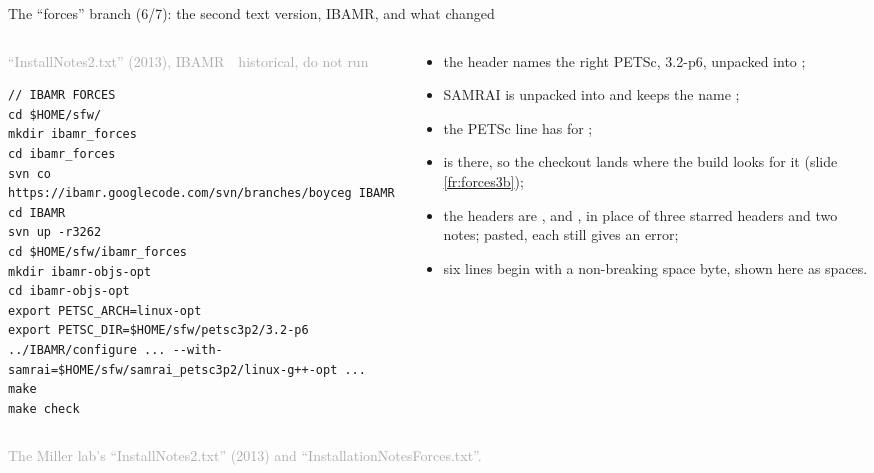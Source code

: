 \documentclass[aspectratio=169,11pt]{beamer}
\newcommand{\sourcecredit}[1]{\vfill\begin{flushright}\tiny\textcolor{DarkGray}{#1}\end{flushright}}
\newcommand{\hist}[1]{{\tiny\sffamily\textcolor{DarkGray}{#1\ \textbullet\ historical, do not run}}\par\nointerlineskip\vspace{0.3mm}}
\begin{document}
\begin{frame}[fragile]{The ``forces'' branch (6/7): the second text version, IBAMR, and what changed}
\label{fr:forces4c}
\begin{columns}[T,onlytextwidth]
\begin{column}{0.53\textwidth}
\hist{``InstallNotes2.txt'' (2013), IBAMR}
\begin{lstlisting}[style=hist]
// IBAMR FORCES
cd $HOME/sfw/
mkdir ibamr_forces
cd ibamr_forces
svn co https://ibamr.googlecode.com/svn/branches/boyceg IBAMR
cd IBAMR
svn up -r3262
cd $HOME/sfw/ibamr_forces
mkdir ibamr-objs-opt
cd ibamr-objs-opt
export PETSC_ARCH=linux-opt
export PETSC_DIR=$HOME/sfw/petsc3p2/3.2-p6
../IBAMR/configure ... --with-samrai=$HOME/sfw/samrai_petsc3p2/linux-g++-opt ...
make
make check
\end{lstlisting}
\end{column}
\begin{column}{0.44\textwidth}
\scriptsize {}
\begin{itemize}\setlength{\itemsep}{1pt}
  \item the header names the right PETSc, 3.2-p6, unpacked into ;
  \item SAMRAI is unpacked into  and keeps the name ;
  \item the PETSc line has  for ;
  \item {} is there, so the checkout lands where the build looks for it (slide \ref{fr:forces3b});
  \item the headers are ,  and , in place of three starred headers and two \code{//} notes; pasted, each still gives an error;
  \item six lines begin with a non-breaking space byte, shown here as spaces.
\end{itemize}
\end{column}
\end{columns}
\sourcecredit{The Miller lab's ``InstallNotes2.txt'' (2013) and ``InstallationNotesForces.txt''.}
\end{frame}
\end{document}
